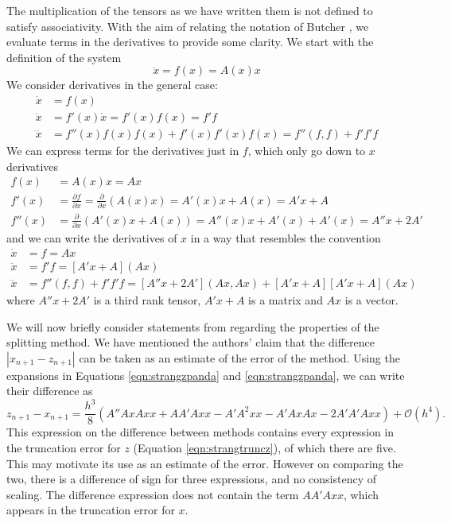 The multiplication of the tensors as we have written them is not defined to satisfy associativity.
With the aim of relating the notation of Butcher \cite{butcher2016numerical}, we evaluate terms in the derivatives to provide some clarity.
We start with the definition of the system
\begin{equation*}
    \dot{x} = f(x) = A(x)x
\end{equation*}
We consider derivatives in the general case:
\begin{align*}
    \dot{x} &= f(x) \\
    \ddot{x} &= f'(x)\dot{x} = f'(x)f(x) = f'f \\
    \dddot{x} &= f''(x)f(x)f(x) + f'(x)f'(x)f(x) = f''(f,f) + f'f'f
\end{align*}
We can express terms for the derivatives just in $f$, which only go down to $x$ derivatives
\begin{align*}
    f(x) &= A(x)x = Ax \\
    f'(x) &= \frac{\partial f}{\partial x} = \frac{\partial}{\partial x} \left( A(x)x \right) = A'(x)x + A(x) = A'x + A \\
    f''(x) &= \frac{\partial}{\partial x} \left( A'(x)x + A(x) \right) = A''(x)x + A'(x) + A'(x) = A''x + 2A'
\end{align*}
and we can write the derivatives of $x$ in a way that resembles the convention
\begin{align*}
    \dot{x} &= f = Ax \\
    \ddot{x} &= f'f = \left[A'x + A\right] \left(Ax\right) \\
    \dddot{x} &= f''(f,f) + f'f'f = \left[ A''x + 2A' \right]\left( Ax, Ax \right) + \left[ A'x + A \right]\left[ A'x + A \right]\left( Ax \right)
\end{align*}
where $A''x + 2A'$ is a third rank tensor, $A'x + A$ is a matrix and $Ax$ is a vector.

We will now briefly consider statements from \cite{blanes_pos_2022} regarding the properties of the splitting method.
We have mentioned the authors' claim that the difference $|x_{n+1} - z_{n+1}|$ can be taken as an estimate of the error of the method.
Using the expansions in Equations \ref{eqn:strangzpanda} and \ref{eqn:strangzpanda}, we can write their difference as
\begin{equation}
    z_{n+1} - x_{n+1} = \frac{h^3}{8} \left(
        A'' Ax Ax x + A A' A xx - A' A^2 xx - A' Ax Ax - 2 A' A' A xx
    \right) + \mathcal{O}(h^4).
    \label{eqn:strangdiff}
\end{equation}
This expression on the difference between methods contains every expression in the truncation error for $z$ (Equation \ref{eqn:strangtruncz}), of which there are five.
This may motivate its use as an estimate of the error.
However on comparing the two, there is a difference of sign for three expressions, and no consistency of scaling.
The difference expression does not contain the term $AA'Axx$, which appears in the truncation error for $x$.


